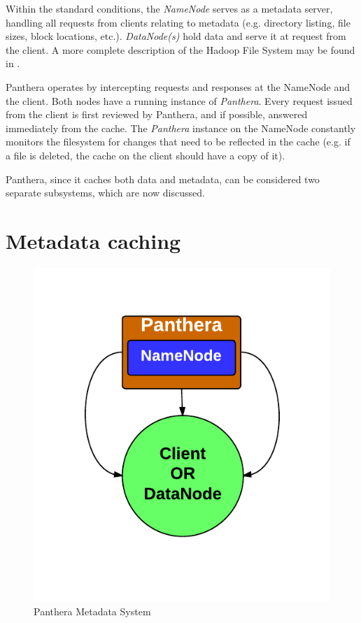 \documentclass{article}
\begin{document}
Within the standard conditions, the \textit{NameNode} serves as a metadata server, handling all requests from clients relating to metadata (e.g. directory listing, file sizes, block locations, etc.). \textit{DataNode(s)} hold data and serve it at request from the client. A more complete description of the Hadoop File System may be found in \cite{hadoop}.

Panthera operates by intercepting requests and responses at the NameNode and the client. Both nodes have a running instance of \textit{Panthera}. Every request issued from the client is first reviewed by Panthera, and if possible, answered immediately from the cache. The \textit{Panthera} instance on the NameNode constantly monitors the filesystem for changes that need to be reflected in the cache (e.g. if a file is deleted, the cache on the client should have a copy of it).

Panthera, since it caches both data and metadata, can be considered two separate subsystems, which are now discussed.

\section{Metadata caching}

\begin{figure}[!h]
	\caption{Panthera Metadata System}
	\centering
		\includegraphics[scale=0.4]{assets/panthera_meta_architecture.pdf}
\end{figure}
\end{document}
